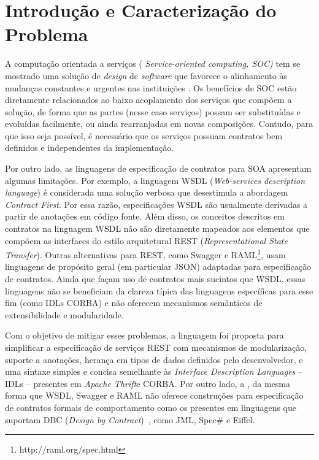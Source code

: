 \section{Introdução e Caracterização do Problema}\label{sec:introducao}

A computação orientada a serviços ( \emph{Service-oriented computing, SOC)} tem
se mostrado uma solução de \textit{design} de \textit{software} que favorece o
alinhamento às mudanças constantes e urgentes nas instituições
\cite{chen2008towards}. Os benefícios de SOC estão diretamente relacionados ao
baixo acoplamento dos serviços que compõem a solução, de forma que as partes
(nesse caso serviços) possam ser substituídas e evoluídas facilmente, ou ainda
rearranjadas em novas composições. Contudo, para que isso seja possível, é
necessário que os serviços possuam contratos bem definidos e independentes da
implementação.

Por outro lado, as linguagens de especificação de contratos para SOA apresentam
algumas limitações. Por exemplo, a linguagem WSDL (\emph{Web-services
description language}) \cite{zur2005developing} é considerada uma solução
verbosa que desestimu\-la a abordagem \textit{Contract First}. Por essa razão,
especificações WSDL são usualmente derivadas a partir de anotações em código
fonte.
Além disso, os conceitos descritos em contratos na linguagem WSDL não são
diretamente mapeados aos elementos que compõem as interfaces do estilo
arquitetural REST (\emph{Representational State Transfer}).
Outras alternativas para REST, como Swagger e
RAML\footnote{http://raml.org/spec.html}, usam linguagens de propósito geral (em
particular JSON) adaptadas para especificação de contratos. Ainda que façam uso
de contratos mais sucintos que WSDL, essas linguagens não se
beneficiam da clareza típica das linguagens específicas para esse fim (como IDLs CORBA) e não oferecem
mecanismos semânticos de extensibilidade e modularidade.

Com o objetivo de mitigar esses problemas, a linguagem \neoidl{} foi proposta
para simplificar a especificação de serviços REST com mecanismos de modularização,
suporte a anotações, herança em tipos de dados definidos pelo desenvolvedor, e
uma sintaxe simples e concisa semelhante às \textit{Interface Description
Languages} -- IDLs -- presentes em \textit{Apache Thrift}\texttrademark e
CORBA\texttrademark. Por outro lado, a \neoidl, da mesma forma que WSDL, Swagger
e RAML não oferece construções para especificação de contratos formais de
comportamento como os presentes em linguagens que suportam DBC (\emph{Design by
Contract})~\cite{meyer1992applying}, como JML, Spec\# e Eiffel.

